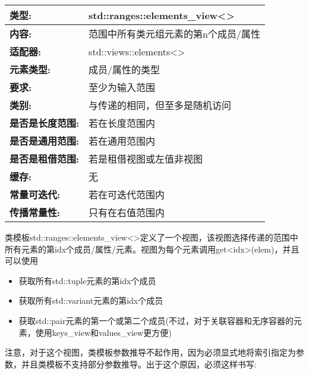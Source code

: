 
\begin{longtable}[c]{|l|l|}
\hline
\textbf{类型:}              & std::ranges::elements\_view\textless{}\textgreater{}            \\ \hline
\endfirsthead
%
\endhead
%
\textbf{内容:}           & 范围中所有类元组元素的第n个成员/属性 \\ \hline
\textbf{适配器:}           & std::views::elements\textless{}\textgreater{}                   \\ \hline
\textbf{元素类型:}         & 成员/属性的类型 \\ \hline
\textbf{要求:}             & 至少为输入范围        \\ \hline
\textbf{类别:}          & 与传递的相同，但至多是随机访问                        \\ \hline
\textbf{是否是长度范围:}       & 若在长度范围内           \\ \hline
\textbf{是否是通用范围:}      & 若在通用范围内          \\ \hline
\textbf{是否是租借范围:} & 若是租借视图或左值非视图                       \\ \hline
\textbf{缓存:}               & 无                     \\ \hline
\textbf{常量可迭代:}       & 若在可迭代范围内  \\ \hline
\textbf{传播常量性:} & 只有在右值范围内     \\ \hline
\end{longtable}

类模板std::ranges::elements\_view<>定义了一个视图，该视图选择传递的范围中所有元素的第idx个成员/属性/元素。视图为每个元素调用get<idx>(elem)，并且可以使用

\begin{itemize}
\item
获取所有std::tuple元素的第idx个成员

\item
获取所有std::variant元素的第idx个成员

\item
获取std::pair元素的第一个或第二个成员(不过，对于关联容器和无序容器的元素，使用keys\_view和values\_view更方便)
\end{itemize}

注意，对于这个视图，类模板参数推导不起作用，因为必须显式地将索引指定为参数，并且类模板不支持部分参数推导。出于这个原因，必须这样书写:

